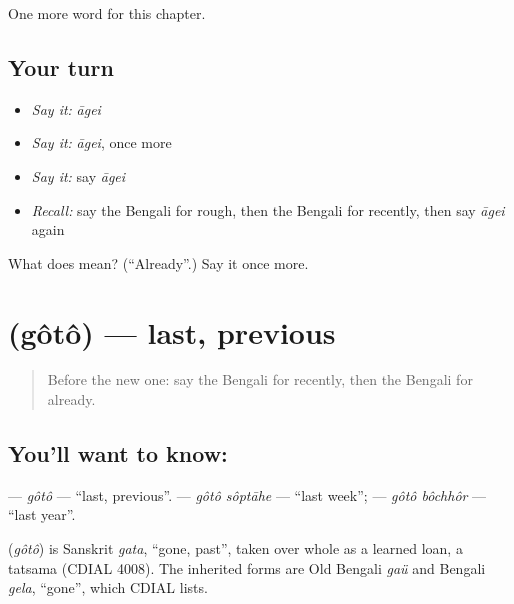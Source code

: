 \begin{grammarlens}[title={What you've built}]
One more word for this chapter.
\end{grammarlens}

\subsection*{Your turn}
\begin{itemize}
\raggedright
  \item \emph{Say it:} \emph{āgei}
  \item \emph{Say it:} \emph{āgei}, once more
  \item \emph{Say it:} say \emph{āgei}
  \item \emph{Recall:} say the Bengali for rough, then the Bengali for recently, then say \emph{āgei} again
\end{itemize}

\begin{tcolorbox}[breakable,colback=teal!4,colframe=teal!35!black,title={Before you move on}]
What does  mean? (\textquotedblleft{}Already\textquotedblright{}.) Say it once more.
\end{tcolorbox}
\section[\texorpdfstring{\bn{গত} (gôtô)}{গত (gôtô)}]{ (gôtô) — last, previous}

\label{lesson:BN-C145-goto}



\begin{quote}
Before the new one: say the Bengali for recently, then the Bengali for already.
\end{quote}

\subsection*{You'll want to know: }
\textbf{} — \emph{gôtô} — \textquotedblleft{}last, previous\textquotedblright{}. \textbf{ } — \emph{gôtô sôptāhe} — \textquotedblleft{}last week\textquotedblright{}; \textbf{ } — \emph{gôtô bôchhôr} — \textquotedblleft{}last year\textquotedblright{}.

\begin{cousinweb}
\textbf{} (\emph{gôtô}) is Sanskrit \emph{gata}, \textquotedblleft{}gone, past\textquotedblright{}, taken over whole as a learned loan, a tatsama (CDIAL 4008). The inherited forms are Old Bengali \emph{gaü} and Bengali \emph{gela}, \textquotedblleft{}gone\textquotedblright{}, which CDIAL lists.
\end{cousinweb}

